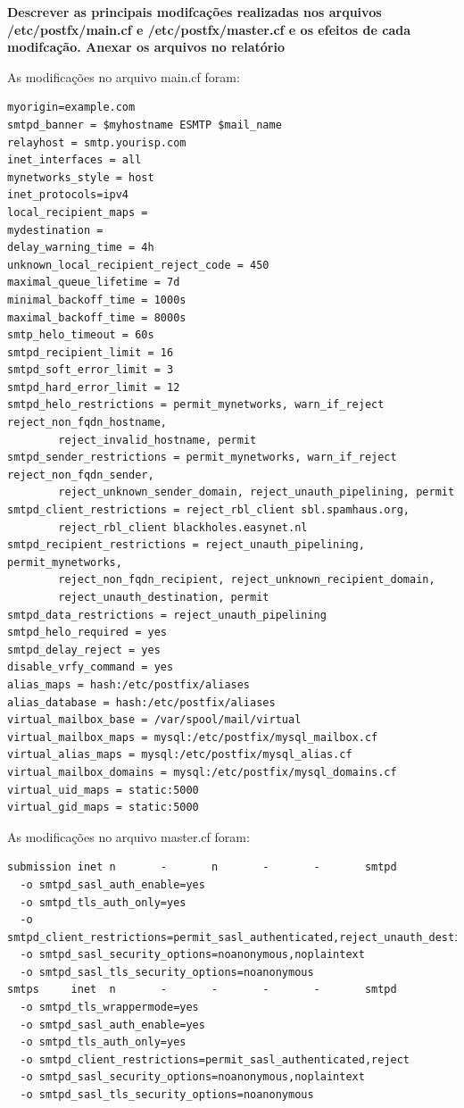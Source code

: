 \documentclass[12pt,answers]{exam}
\begin{document}
\begin{questions}

\question \textbf{Descrever as principais modifcações realizadas nos arquivos /etc/postfx/main.cf e /etc/postfx/master.cf e os efeitos de cada modifcação. Anexar os arquivos no relatório}

As modificações no arquivo main.cf foram:
\begin{lstlisting}
myorigin=example.com
smtpd_banner = $myhostname ESMTP $mail_name
relayhost = smtp.yourisp.com
inet_interfaces = all
mynetworks_style = host
inet_protocols=ipv4
local_recipient_maps =
mydestination =
delay_warning_time = 4h
unknown_local_recipient_reject_code = 450
maximal_queue_lifetime = 7d
minimal_backoff_time = 1000s
maximal_backoff_time = 8000s
smtp_helo_timeout = 60s
smtpd_recipient_limit = 16
smtpd_soft_error_limit = 3
smtpd_hard_error_limit = 12
smtpd_helo_restrictions = permit_mynetworks, warn_if_reject reject_non_fqdn_hostname,
		reject_invalid_hostname, permit
smtpd_sender_restrictions = permit_mynetworks, warn_if_reject reject_non_fqdn_sender,
		reject_unknown_sender_domain, reject_unauth_pipelining, permit
smtpd_client_restrictions = reject_rbl_client sbl.spamhaus.org,
		reject_rbl_client blackholes.easynet.nl
smtpd_recipient_restrictions = reject_unauth_pipelining, permit_mynetworks,
		reject_non_fqdn_recipient, reject_unknown_recipient_domain,
		reject_unauth_destination, permit
smtpd_data_restrictions = reject_unauth_pipelining
smtpd_helo_required = yes
smtpd_delay_reject = yes
disable_vrfy_command = yes
alias_maps = hash:/etc/postfix/aliases
alias_database = hash:/etc/postfix/aliases
virtual_mailbox_base = /var/spool/mail/virtual
virtual_mailbox_maps = mysql:/etc/postfix/mysql_mailbox.cf
virtual_alias_maps = mysql:/etc/postfix/mysql_alias.cf
virtual_mailbox_domains = mysql:/etc/postfix/mysql_domains.cf
virtual_uid_maps = static:5000
virtual_gid_maps = static:5000
\end{lstlisting}

As modificações no arquivo master.cf foram:
\begin{lstlisting}
submission inet n       -       n       -       -       smtpd
  -o smtpd_sasl_auth_enable=yes
  -o smtpd_tls_auth_only=yes
  -o smtpd_client_restrictions=permit_sasl_authenticated,reject_unauth_destination,reject
  -o smtpd_sasl_security_options=noanonymous,noplaintext
  -o smtpd_sasl_tls_security_options=noanonymous
smtps     inet  n       -       -       -       -       smtpd
  -o smtpd_tls_wrappermode=yes
  -o smtpd_sasl_auth_enable=yes
  -o smtpd_tls_auth_only=yes
  -o smtpd_client_restrictions=permit_sasl_authenticated,reject
  -o smtpd_sasl_security_options=noanonymous,noplaintext
  -o smtpd_sasl_tls_security_options=noanonymous
\end{lstlisting}


\end{questions}
\end{document}
